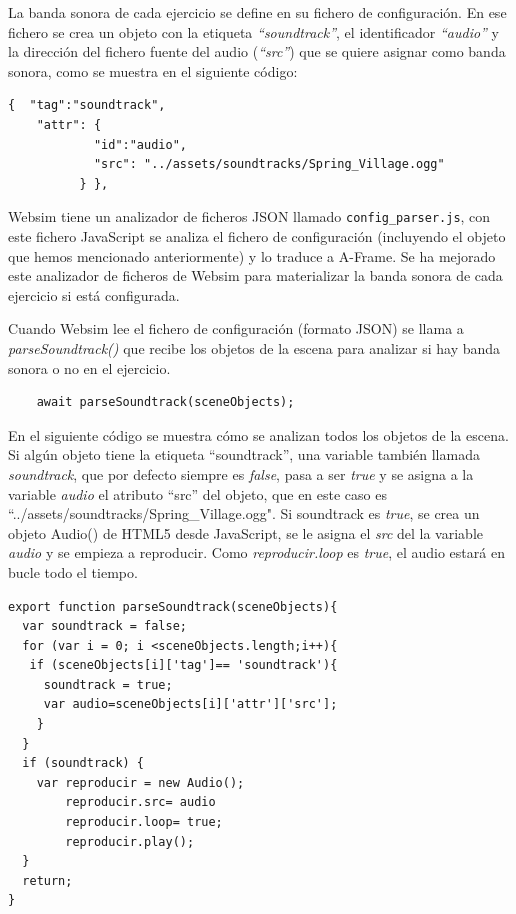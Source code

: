 La banda sonora de cada ejercicio se define en su fichero de configuración. En ese fichero se crea un objeto con la etiqueta \textit{``soundtrack''}, el identificador \textit{``audio''} y la dirección del fichero fuente del audio (\textit{``src''}) que se quiere asignar como banda sonora, como se muestra en el siguiente código:
\\
\begin{lstlisting}
{  "tag":"soundtrack",
    "attr": {
            "id":"audio",
            "src": "../assets/soundtracks/Spring_Village.ogg"
          } },
   \end{lstlisting}

Websim tiene un analizador de ficheros JSON llamado \texttt{config\_parser.js}, con este fichero JavaScript se analiza el fichero de configuración (incluyendo el objeto que hemos mencionado anteriormente) y lo traduce a A-Frame. Se ha mejorado este analizador de ficheros de Websim para materializar la banda sonora de cada ejercicio si está configurada.

Cuando Websim lee el fichero de configuración (formato JSON) se llama a \textit{parseSoundtrack()} que recibe los objetos de la escena para analizar si hay banda sonora o no en el ejercicio.
\begin{lstlisting}
 	await parseSoundtrack(sceneObjects);
\end{lstlisting}

En el siguiente código se muestra cómo se analizan todos los objetos de la escena. Si algún objeto tiene la etiqueta ``soundtrack'', una variable también llamada \textit{soundtrack}, que por defecto siempre es \textit{false}, pasa a ser \textit{true} y se asigna a la variable \textit{audio} el atributo  ``src'' del objeto,  que en este caso es  ``../assets/soundtracks/Spring\_Village.ogg".  
Si soundtrack es \textit{true}, se crea un objeto Audio() de HTML5 desde JavaScript, se le asigna el \textit{src} del la variable \textit{audio} y se empieza a reproducir. Como \textit{reproducir.loop} es \textit{true}, el audio estará en bucle todo el tiempo.

\begin{lstlisting}
export function parseSoundtrack(sceneObjects){
  var soundtrack = false;
  for (var i = 0; i <sceneObjects.length;i++){
   if (sceneObjects[i]['tag']== 'soundtrack'){
     soundtrack = true;
     var audio=sceneObjects[i]['attr']['src'];
    }
  }
  if (soundtrack) {
    var reproducir = new Audio();
        reproducir.src= audio
        reproducir.loop= true;
        reproducir.play();
  }
  return;
}
\end{lstlisting}

